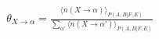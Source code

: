 \documentclass[10pt]{article}
\begin{document}
\begin{align*}%
\theta_{X\rightarrow \alpha} = \frac{\langle n(X\rightarrow \alpha) \rangle_{P(A, B|F, E)}}{\sum_{\alpha'} \langle n(X\rightarrow \alpha') \rangle_{P(A, B|F, E)}}\end{align*}
\end{document}
